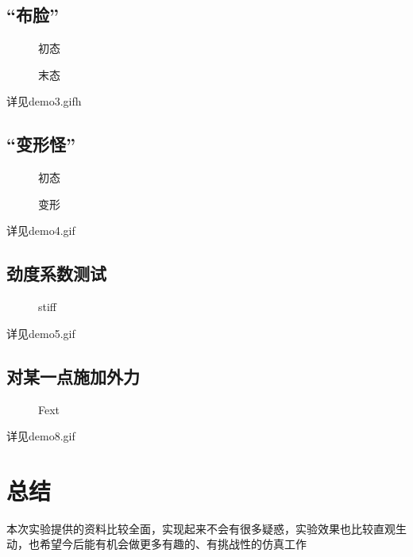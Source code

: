 \documentclass[14pt]{scrartcl} %
\begin{document}
\pagebreak
\subsection{“布脸”}
\begin{figure}[h] %
	\centering
	\caption{初态}
\end{figure}
\begin{figure}[h] %
	\centering
	\caption{末态}
\end{figure}
详见demo3.gifh

\pagebreak
\subsection{“变形怪”}
\begin{figure}[h] %
	\centering
	\caption{初态}
\end{figure}
\begin{figure}[h] %
	\centering
	\caption{变形}
\end{figure}
详见demo4.gif

\pagebreak
\subsection{劲度系数测试}
\begin{figure}[h] %
	\centering
	\caption{stiff}
\end{figure}
详见demo5.gif

\subsection{对某一点施加外力}

\begin{figure}[h] %
	\centering
	\caption{Fext}
\end{figure}
详见demo8.gif

\pagebreak
\section{总结}
本次实验提供的资料比较全面，实现起来不会有很多疑惑，实验效果也比较直观生动，也希望今后能有机会做更多有趣的、有挑战性的仿真工作



\end{document}
